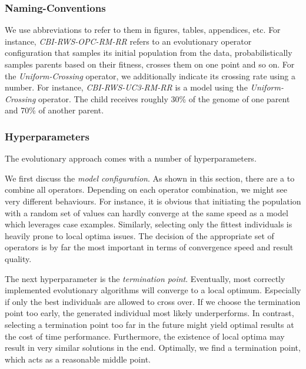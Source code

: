 \documentclass[./../../paper.tex]{subfiles}
\begin{document}
\subsubsection{Naming-Conventions}
We use abbreviations to refer to them in figures, tables, appendices, etc. For instance, \emph{CBI-RWS-OPC-RM-RR} refers to an evolutionary operator configuration that samples its initial population from the data, probabilistically samples parents based on their fitness, crosses them on one point and so on. For the \emph{Uniform-Crossing} operator, we additionally indicate its crossing rate using a number. For instance, \emph{CBI-RWS-UC3-RM-RR} is a model using the \emph{Uniform-Crossing} operator. The child receives roughly 30\% of the genome of one parent and 70\% of another parent.

\subsubsection{Hyperparameters}
The evolutionary approach comes with a number of hyperparameters. 

We first discuss the \emph{model configuration}. As shown in this section, there are a \NumEvoCombinations to combine all operators. Depending on each operator combination, we might see very different behaviours. For instance, it is obvious that initiating the population with a random set of values can hardly converge at the same speed as a model which leverages case examples. Similarly, selecting only the fittest individuals is heavily prone to local optima issues. The decision of the appropriate set of operators is by far the most important in terms of convergence speed and result quality.

The next hyperparameter is the \emph{termination point}. Eventually, most correctly implemented evolutionary algorithms will converge to a local optimum. Especially if only the best individuals are allowed to cross over. If we choose the termination point too early, the generated individual most likely underperforms. In contrast, selecting a termination point too far in the future might yield optimal results at the cost of time performance. Furthermore, the existence of local optima may result in very similar solutions in the end. Optimally, we find a termination point, which acts as a reasonable middle point.
\end{document}

